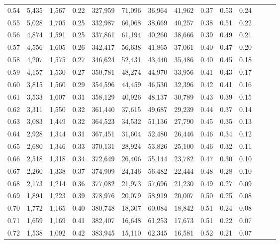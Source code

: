 \begin{tabular}{rrrrrrrrrrrrrr}
0.54 &  5,435 &  1,567 &  0.22 &  327,959 &   71,096 &  36,964 &  41,962 &  0.37 &  0.53 &      0.24 \\
0.55 &  5,028 &  1,705 &  0.25 &  332,987 &   66,068 &  38,669 &  40,257 &  0.38 &  0.51 &      0.22 \\
0.56 &  4,874 &  1,591 &  0.25 &  337,861 &   61,194 &  40,260 &  38,666 &  0.39 &  0.49 &      0.21 \\
0.57 &  4,556 &  1,605 &  0.26 &  342,417 &   56,638 &  41,865 &  37,061 &  0.40 &  0.47 &      0.20 \\
0.58 &  4,207 &  1,575 &  0.27 &  346,624 &   52,431 &  43,440 &  35,486 &  0.40 &  0.45 &      0.18 \\
0.59 &  4,157 &  1,530 &  0.27 &  350,781 &   48,274 &  44,970 &  33,956 &  0.41 &  0.43 &      0.17 \\
0.60 &  3,815 &  1,560 &  0.29 &  354,596 &   44,459 &  46,530 &  32,396 &  0.42 &  0.41 &      0.16 \\
0.61 &  3,533 &  1,607 &  0.31 &  358,129 &   40,926 &  48,137 &  30,789 &  0.43 &  0.39 &      0.15 \\
0.62 &  3,311 &  1,550 &  0.32 &  361,440 &   37,615 &  49,687 &  29,239 &  0.44 &  0.37 &      0.14 \\
0.63 &  3,083 &  1,449 &  0.32 &  364,523 &   34,532 &  51,136 &  27,790 &  0.45 &  0.35 &      0.13 \\
0.64 &  2,928 &  1,344 &  0.31 &  367,451 &   31,604 &  52,480 &  26,446 &  0.46 &  0.34 &      0.12 \\
0.65 &  2,680 &  1,346 &  0.33 &  370,131 &   28,924 &  53,826 &  25,100 &  0.46 &  0.32 &      0.11 \\
0.66 &  2,518 &  1,318 &  0.34 &  372,649 &   26,406 &  55,144 &  23,782 &  0.47 &  0.30 &      0.10 \\
0.67 &  2,260 &  1,338 &  0.37 &  374,909 &   24,146 &  56,482 &  22,444 &  0.48 &  0.28 &      0.10 \\
0.68 &  2,173 &  1,214 &  0.36 &  377,082 &   21,973 &  57,696 &  21,230 &  0.49 &  0.27 &      0.09 \\
0.69 &  1,894 &  1,223 &  0.39 &  378,976 &   20,079 &  58,919 &  20,007 &  0.50 &  0.25 &      0.08 \\
0.70 &  1,772 &  1,165 &  0.40 &  380,748 &   18,307 &  60,084 &  18,842 &  0.51 &  0.24 &      0.08 \\
0.71 &  1,659 &  1,169 &  0.41 &  382,407 &   16,648 &  61,253 &  17,673 &  0.51 &  0.22 &      0.07 \\
0.72 &  1,538 &  1,092 &  0.42 &  383,945 &   15,110 &  62,345 &  16,581 &  0.52 &  0.21 &      0.07 \\

\end{tabular}
